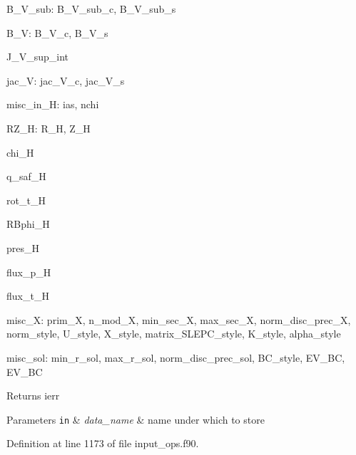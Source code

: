\begin{DoxyItemize}
\item {\ttfamily B\+\_\+\+V\+\_\+sub\+:} {\ttfamily B\+\_\+\+V\+\_\+sub\+\_\+c}, {\ttfamily B\+\_\+\+V\+\_\+sub\+\_\+s} 
\item {\ttfamily B\+\_\+V\+:} {\ttfamily B\+\_\+\+V\+\_\+c}, {\ttfamily B\+\_\+\+V\+\_\+s} 
\item {\ttfamily J\+\_\+\+V\+\_\+sup\+\_\+int} 
\item {\ttfamily jac\+\_\+V\+:} {\ttfamily jac\+\_\+\+V\+\_\+c}, {\ttfamily jac\+\_\+\+V\+\_\+s} 
\item {\ttfamily misc\+\_\+in\+\_\+H\+:} {\ttfamily ias}, {\ttfamily nchi} 
\item {\ttfamily R\+Z\+\_\+H\+:} {\ttfamily R\+\_\+H}, {\ttfamily Z\+\_\+H} 
\item {\ttfamily chi\+\_\+H} 
\item {\ttfamily q\+\_\+saf\+\_\+H} 
\item {\ttfamily rot\+\_\+t\+\_\+H} 
\item {\ttfamily R\+Bphi\+\_\+H} 
\item {\ttfamily pres\+\_\+H} 
\item {\ttfamily flux\+\_\+p\+\_\+H} 
\item {\ttfamily flux\+\_\+t\+\_\+H} 
\item {\ttfamily misc\+\_\+X\+:} {\ttfamily prim\+\_\+X}, {\ttfamily n\+\_\+mod\+\_\+X}, {\ttfamily min\+\_\+sec\+\_\+X}, {\ttfamily max\+\_\+sec\+\_\+X}, {\ttfamily norm\+\_\+disc\+\_\+prec\+\_\+X}, {\ttfamily norm\+\_\+style}, {\ttfamily U\+\_\+style}, {\ttfamily X\+\_\+style}, {\ttfamily matrix\+\_\+\+S\+L\+E\+P\+C\+\_\+style}, {\ttfamily K\+\_\+style}, {\ttfamily alpha\+\_\+style} 
\item {\ttfamily misc\+\_\+sol\+:} {\ttfamily min\+\_\+r\+\_\+sol}, {\ttfamily max\+\_\+r\+\_\+sol}, {\ttfamily norm\+\_\+disc\+\_\+prec\+\_\+sol}, {\ttfamily B\+C\+\_\+style}, {\ttfamily E\+V\+\_\+\+BC}, {\ttfamily E\+V\+\_\+\+BC} 
\end{DoxyItemize}

\begin{DoxyReturn}{Returns}
ierr
\end{DoxyReturn}

\begin{DoxyParams}[1]{Parameters}
\mbox{\tt in}  & {\em data\+\_\+name} & name under which to store \\
\hline
\end{DoxyParams}


Definition at line 1173 of file input\+\_\+ops.\+f90.

